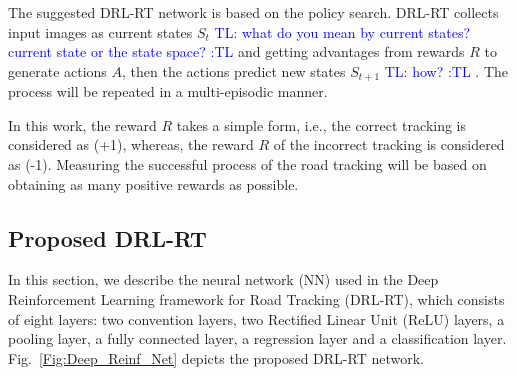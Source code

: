 \documentclass{svproc}
\newcommand{\tl}[1]{\textcolor{blue} {TL: #1 :TL} }
\begin{document}
The suggested DRL-RT network is based on the policy search. %
DRL-RT collects input images as current states $S_t$ \tl{what do you mean by current states? current state or the state space?} and getting advantages from rewards $R$ to generate actions $A$, then the actions predict new states $S_{t+1}$ \tl{how?}. The process will be repeated in a multi-episodic manner. %


In this work, the reward $R$ takes a simple form, i.e., the correct tracking is considered as (+1), whereas, the reward $R$ of the incorrect tracking is considered as (-1). Measuring the successful process of the road tracking will be based on obtaining as many positive rewards as possible. 

\subsection{Proposed DRL-RT} 
In this section, we describe the neural network (NN) used in the Deep Reinforcement Learning framework for Road Tracking (DRL-RT), which consists of eight layers: two convention layers, two Rectified Linear Unit (ReLU) layers, a pooling layer, a fully connected layer, a regression layer and a classification layer. Fig.~\ref{Fig:Deep_Reinf_Net} depicts the proposed DRL-RT network.
\end{document}
